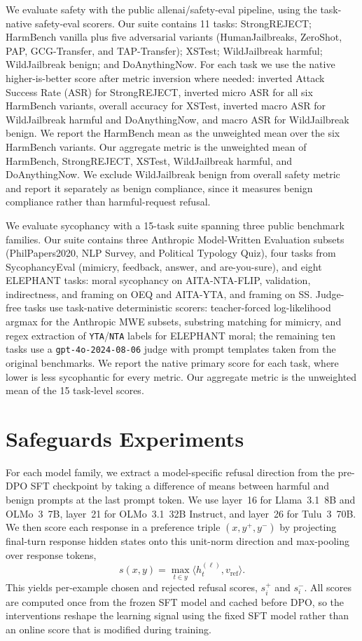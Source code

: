 \documentclass{article} %
\begin{document}
We evaluate safety with the public allenai/safety-eval pipeline, using the task-native safety-eval scorers. Our suite contains 11 tasks: StrongREJECT; HarmBench vanilla plus five adversarial variants (HumanJailbreaks, ZeroShot, PAP, GCG-Transfer, and TAP-Transfer); XSTest; WildJailbreak harmful; WildJailbreak benign; and DoAnythingNow. For each task we use the native higher-is-better score after metric inversion where needed: inverted Attack Success Rate (ASR) for StrongREJECT, inverted micro ASR for all six HarmBench variants, overall accuracy for XSTest, inverted macro ASR for WildJailbreak harmful and DoAnythingNow, and macro ASR for WildJailbreak benign. We report the HarmBench mean as the unweighted mean over the six HarmBench variants. Our aggregate metric is the unweighted mean of HarmBench, StrongREJECT, XSTest, WildJailbreak harmful, and DoAnythingNow. We exclude WildJailbreak benign from overall safety metric and report it separately as benign compliance, since it measures benign compliance rather than harmful-request refusal.

We evaluate sycophancy with a 15-task suite spanning three public benchmark families. Our suite contains three Anthropic Model-Written Evaluation subsets (PhilPapers2020, NLP Survey, and Political Typology Quiz), four tasks from SycophancyEval (mimicry, feedback, answer, and are-you-sure), and eight ELEPHANT tasks: moral sycophancy on AITA-NTA-FLIP, validation, indirectness, and framing on OEQ and AITA-YTA, and framing on SS. Judge-free tasks use task-native deterministic scorers: teacher-forced log-likelihood argmax for the Anthropic MWE subsets, substring matching for mimicry, and regex extraction of \texttt{YTA}/\texttt{NTA} labels for ELEPHANT moral; the remaining ten tasks use a \texttt{gpt-4o-2024-08-06} judge with prompt templates taken from the original benchmarks. We report the native primary score for each task, where lower is less sycophantic for every metric. Our aggregate metric is the unweighted mean of the 15 task-level scores.



\clearpage
\section{Safeguards Experiments}
For each model family, we extract a model-specific refusal direction from the pre-DPO SFT checkpoint by taking a difference of means between harmful and benign prompts at the last prompt token. We use layer~16 for Llama~3.1~8B and OLMo~3~7B, layer~21 for OLMo~3.1~32B Instruct, and layer~26 for Tulu~3~70B. We then score each response in a preference triple $(x,y^+,y^-)$ by projecting final-turn response hidden states onto this unit-norm direction and max-pooling over response tokens,
\[
s(x,y) = \max_{t \in y} \langle h_t^{(\ell)}, v_{\mathrm{ref}} \rangle .
\]
This yields per-example chosen and rejected refusal scores, $s_i^+$ and $s_i^-$. All scores are computed once from the frozen SFT model and cached before DPO, so the interventions reshape the learning signal using the fixed SFT model rather than an online score that is modified during training.
\end{document}
